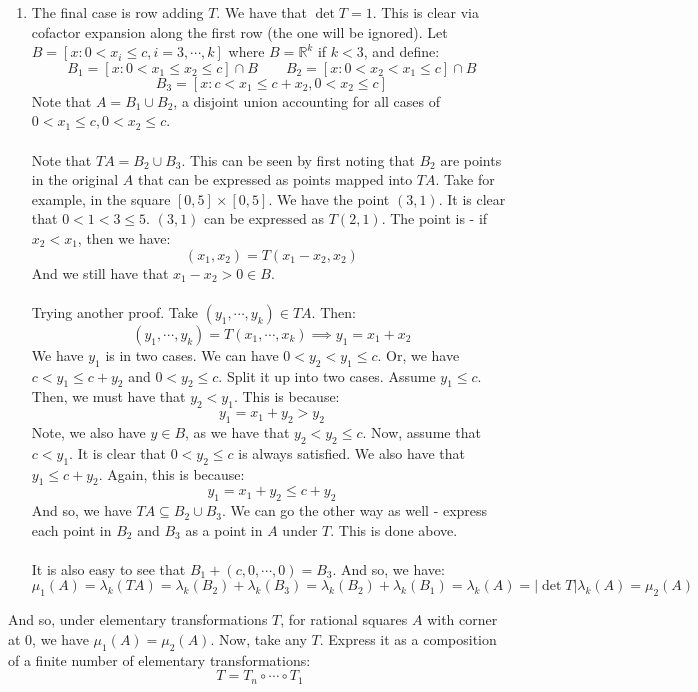 \documentclass[12pt,a4paper]{article}
\newcommand{\1}[1]{\mathbbm{1}\left\{ #1 \right\}}
\newcommand{\R}{\mathbb{R}}
\begin{document}
\begin{enumerate}
	\item The final case is row adding $T$. We have that $\det T = 1$. This is clear via cofactor expansion along the first row (the one will be ignored). Let $B = \left[x : 0 < x_i \leq c, i = 3, \cdots, k\right]$ where $B = \R^k$ if $k < 3$, and define:
	$$
		B_1 = [x : 0 < x_1 \leq x_2 \leq c] \cap B \quad\quad
		B_2 = [x : 0 < x_2 < x_1 \leq c] \cap B
	$$
	$$
		B_3 = [x : c < x_1 \leq c + x_2, 0 < x_2 \leq c]
	$$
	Note that $A = B_1 \cup B_2$, a disjoint union accounting for all cases of $0 < x_1 \leq c, 0 < x_2 \leq c$. 
	\\\\
	Note that $TA = B_2 \cup B_3$. This can be seen by first noting that $B_2$ are points in the original $A$ that can be expressed as points mapped into $TA$. Take for example, in the square $[0, 5] \times [0, 5]$. We have the point $(3, 1)$. It is clear that $0 < 1 < 3 \leq 5$. $(3,1)$ can be expressed as $T(2,1)$. The point is - if $x_2 < x_1$, then we have:
	$$
		(x_1,x_2) = T(x_1 - x_2,x_2)
	$$
	And we still have that $x_1 - x_2 > 0 \in B$.
	\\\\
	Trying another proof. Take $(y_1, \cdots, y_k) \in TA$. Then:
	$$
		(y_1, \cdots, y_k) = T(x_1, \cdots, x_k) \implies
		y_1 = x_1 + x_2
	$$
	We have $y_1$ is in two cases. We can have $0 < y_2 < y_1 \leq c$. Or, we have $c < y_1 \leq c + y_2$ and $0 < y_2 \leq c$. Split it up into two cases. Assume $y_1 \leq c$. Then, we must have that $y_2 < y_1$. This is because:
	$$
		y_1 = x_1 + y_2 > y_2
	$$
	Note, we also have $y \in B$, as we have that $y_2 < y_2 \leq c$. Now, assume that $c < y_1$. It is clear that $0 < y_2 \leq c$ is always satisfied. We also have that $y_1 \leq c + y_2$. Again, this is because:
	$$
		y_1 = x_1 + y_2 \leq c + y_2
	$$
	And so, we have $TA \subseteq B_2 \cup B_3$. We can go the other way as well - express each point in $B_2$ and $B_3$ as a point in $A$ under $T$. This is done above.
	\\\\
	It is also easy to see that $B_1 + (c,0,\cdots,0) = B_3$. And so, we have:
	$$
		\mu_1(A) = \lambda_k(TA) = \lambda_k(B_2) + \lambda_k(B_3) = \lambda_k(B_2) + \lambda_k(B_1) = 
		\lambda_k(A) = |\det T|\lambda_k(A) = \mu_2(A)
	$$
\end{enumerate}
And so, under elementary transformations $T$, for rational squares $A$ with corner at $0$, we have $\mu_1(A) = \mu_2(A)$. Now, take any $T$. Express it as a composition of a finite number of elementary transformations:
$$
	T = T_n \circ \cdots \circ T_1
$$
\end{document}
